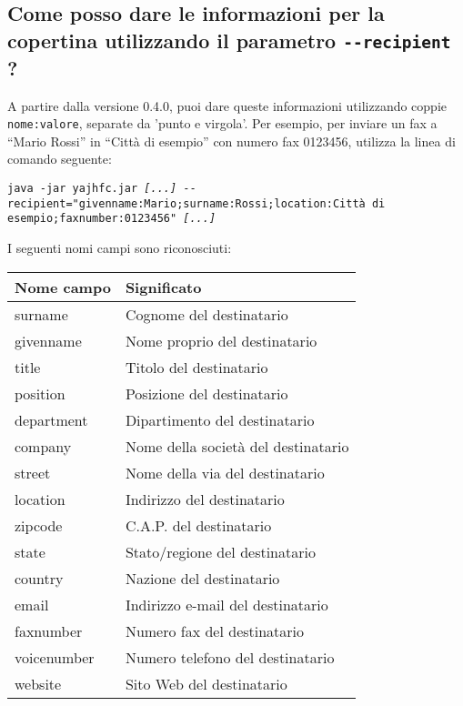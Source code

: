 \documentclass[a4paper,10pt]{scrartcl}
\begin{document}
\subsection{Come posso dare le informazioni per la copertina utilizzando il parametro \texttt{-{-}recipient} ?}

A partire dalla versione 0.4.0, puoi dare queste informazioni utilizzando coppie \texttt{nome:valore}, separate da 'punto e virgola'. Per esempio, per inviare un fax a ``Mario Rossi'' in ``Città di esempio'' con numero fax 0123456, utilizza la linea di comando seguente:

\texttt{java -jar yajhfc.jar \textit{[...]} -{-}recipient="givenname:Mario;surname:Rossi;location:Città di esempio;faxnumber:0123456" \textit{[...]}}

I seguenti nomi campi sono riconosciuti:
\begin{center}
\begin{tabular}{|l|p{}|}
\hline
\bfseries Nome campo & \bfseries Significato \\
\hline\hline
\ttfamily surname & Cognome del destinatario\\\hline
\ttfamily givenname & Nome proprio del destinatario \\\hline
\ttfamily title & Titolo del destinatario \\\hline
\ttfamily position & Posizione del destinatario \\\hline
\ttfamily department & Dipartimento del destinatario\\\hline
\ttfamily company & Nome della società del destinatario\\\hline
\ttfamily street & Nome della via del destinatario \\\hline
\ttfamily location & Indirizzo del destinatario\\\hline
\ttfamily zipcode & C.A.P. del destinatario \\\hline
\ttfamily state & Stato/regione del destinatario\\\hline
\ttfamily country & Nazione del destinatario\\\hline
\ttfamily email & Indirizzo e-mail del destinatario\\\hline
\ttfamily faxnumber & Numero fax del destinatario \\\hline
\ttfamily voicenumber & Numero telefono del destinatario \\\hline
\ttfamily website & Sito Web del destinatario\\\hline
\end{tabular}
\end{center}
\end{document}
